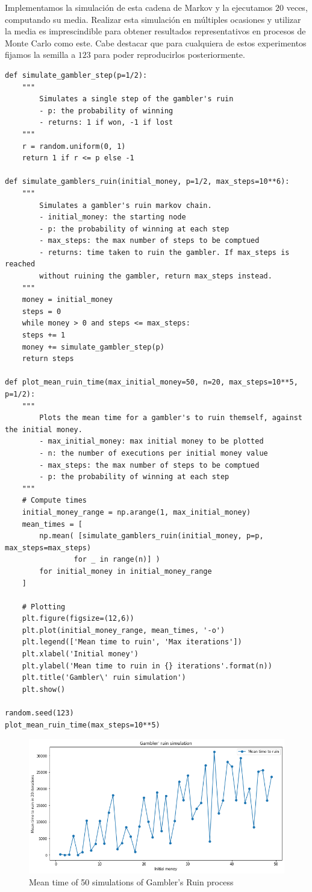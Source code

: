 \documentclass[a4paper]{article}
\begin{document}
Implementamos la simulación de esta cadena de Markov y la ejecutamos $20$ veces, computando su media. Realizar esta simulación en múltiples ocasiones y utilizar la media es imprescindible para obtener resultados representativos en procesos de Monte Carlo como este. Cabe destacar que para cualquiera de estos experimentos fijamos la semilla a $123$ para poder reproducirlos posteriormente.
	
\begin{verbatim}
def simulate_gambler_step(p=1/2):
	""" 
		Simulates a single step of the gambler's ruin
		- p: the probability of winning
		- returns: 1 if won, -1 if lost
	"""
	r = random.uniform(0, 1)
	return 1 if r <= p else -1

def simulate_gamblers_ruin(initial_money, p=1/2, max_steps=10**6):
	"""
		Simulates a gambler's ruin markov chain.
		- initial_money: the starting node
		- p: the probability of winning at each step
		- max_steps: the max number of steps to be comptued
		- returns: time taken to ruin the gambler. If max_steps is reached
		without ruining the gambler, return max_steps instead.
	"""
	money = initial_money
	steps = 0
	while money > 0 and steps <= max_steps:
	steps += 1
	money += simulate_gambler_step(p)
	return steps

def plot_mean_ruin_time(max_initial_money=50, n=20, max_steps=10**5, p=1/2):
	"""
		Plots the mean time for a gambler's to ruin themself, against the initial money.
		- max_initial_money: max initial money to be plotted
		- n: the number of executions per initial money value
		- max_steps: the max number of steps to be comptued
		- p: the probability of winning at each step
	"""
	# Compute times
	initial_money_range = np.arange(1, max_initial_money)
	mean_times = [
		np.mean( [simulate_gamblers_ruin(initial_money, p=p, max_steps=max_steps)
				for _ in range(n)] )
		for initial_money in initial_money_range
	]

	# Plotting
	plt.figure(figsize=(12,6))
	plt.plot(initial_money_range, mean_times, '-o')
	plt.legend(['Mean time to ruin', 'Max iterations'])
	plt.xlabel('Initial money')
	plt.ylabel('Mean time to ruin in {} iterations'.format(n))
	plt.title('Gambler\' ruin simulation')
	plt.show()
	
random.seed(123)
plot_mean_ruin_time(max_steps=10**5)
\end{verbatim}
	
\begin{figure}[H]
	\includegraphics[scale=.6]{figures/gambler1}
	\centering
	\caption{Mean time of 50 simulations of Gambler's Ruin process}
\end{figure}
\end{document}
